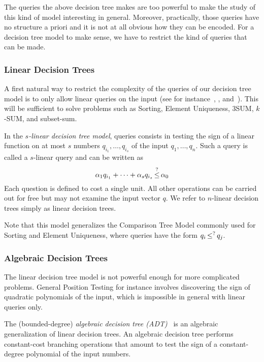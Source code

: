 The queries the above decision tree makes are too powerful to make the study of
this kind of model interesting in general.
%
Moreover, practically, those queries have no structure a priori and it is not at
all obvious how they can be encoded.
%
For a decision tree model to make sense, we have to restrict the kind of
queries that can be made.

\subsubsection{Linear Decision Trees}

A first natural way to restrict the complexity of the queries of our decision
tree model is to only allow linear queries on the input
(see for instance~\cite[Section~1]{Dob76},
\cite[Section~2]{DL78}, and~\cite[Section~4]{DL79}).
This will be sufficient to solve problems such as Sorting, Element Uniqueness,
3SUM, \(k\)-SUM, and subset-sum.

In the \emph{\(s\)-linear decision tree model}, queries consists
in testing the sign of a linear function on at most \(s\) numbers \(q_{i_1},\ldots,q_{i_s}\) of the
input \(q_1,\ldots,q_n\). Such a query is called a \(s\)-linear query and
can be written as
%
\begin{displaymath}
	\alpha_1 q_{i_1} + \cdots + \alpha_s q_{i_s} \mathop{\leq}^{?} \alpha_0
\end{displaymath}
%
Each question is defined to cost a single unit. All other operations can be
carried out for free but may not examine the input vector $q$. We refer to
$n$-linear decision trees simply as linear decision trees.

Note that this model generalizes the Comparison Tree Model commonly used for
Sorting and Element Uniqueness, where queries have the form \(q_i \mathop{\leq}^{?}
q_j\).

\subsubsection{Algebraic Decision Trees}
The linear decision tree model is not powerful enough for more complicated
problems. General Position Testing for instance involves discovering the sign
of quadratic polynomials of the input, which is impossible in general with
linear queries only.

The (bounded-degree) \emph{algebraic decision tree (ADT)}~\cite{R72,Y81,SY82}
is an algebraic generalization of linear decision trees.
An algebraic decision tree performs constant-cost branching operations that
amount to test the sign of
a constant-degree polynomial of the input numbers.

